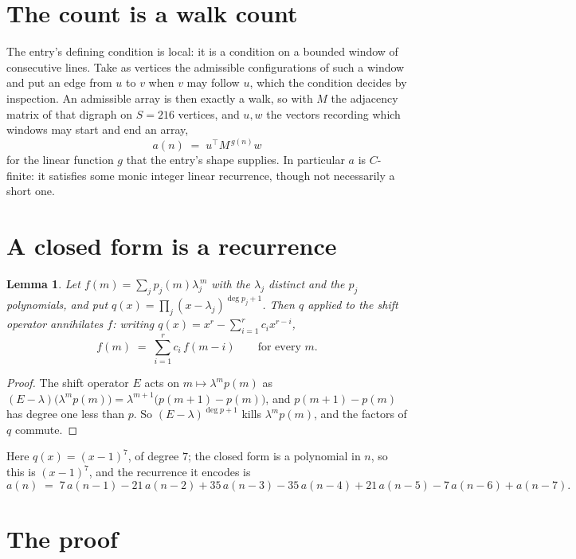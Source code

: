 \documentclass[11pt,a4paper]{article}
\theoremstyle{plain}
\newtheorem{lemma}[theorem]{Lemma}
\theoremstyle{definition}
\begin{document}
\section{The count is a walk count}

The entry's defining condition is local: it is a condition on a bounded window of consecutive lines. Take as vertices the
admissible configurations of such a window and put an edge from $u$ to $v$ when $v$ may
follow $u$, which the condition decides by inspection. An admissible array is then exactly a
walk, so with $M$ the adjacency matrix of that digraph on $S=216$ vertices, and $u,w$ the
vectors recording which windows may start and end an array,
\[
a(n)\;=\;u^{\!\top}M^{\,g(n)}w
\]
for the linear function $g$ that the entry's shape supplies. In particular $a$ is
$C$-finite: it satisfies some monic integer linear recurrence, though not necessarily a short
one.

\section{A closed form is a recurrence}

\begin{lemma}\label{lem:ann}
Let $f(m)=\sum_{j}p_j(m)\lambda_j^{\,m}$ with the $\lambda_j$ distinct and the $p_j$
polynomials, and put $q(x)=\prod_j(x-\lambda_j)^{\deg p_j+1}$. Then $q$ applied to the shift
operator annihilates $f$: writing $q(x)=x^{r}-\sum_{i=1}^{r}c_ix^{r-i}$,
\[
f(m)\;=\;\sum_{i=1}^{r}c_i\,f(m-i)\qquad\text{for every }m.
\]
\end{lemma}

\begin{proof}
The shift operator $E$ acts on $m\mapsto\lambda^{m}p(m)$ as
$(E-\lambda)\bigl(\lambda^{m}p(m)\bigr)=\lambda^{m+1}\bigl(p(m+1)-p(m)\bigr)$, and
$p(m+1)-p(m)$ has degree one less than $p$. So $(E-\lambda)^{\deg p+1}$ kills
$\lambda^{m}p(m)$, and the factors of $q$ commute.
\end{proof}

Here $q(x)=(x-1)^{7}$, of degree $7$; the closed form is a polynomial in $n$, so this is $(x-1)^{7}$, and the recurrence it encodes is
\begin{equation}\label{eq:rec}
a(n)\;=\;7\,a(n-1) - 21\,a(n-2) + 35\,a(n-3) - 35\,a(n-4) + 21\,a(n-5) - 7\,a(n-6) + a(n-7).
\end{equation}

\section{The proof}
\end{document}

